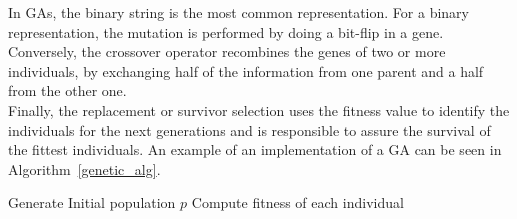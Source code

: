 In  GAs, the binary string is the most common representation. For a binary representation, the mutation is performed by doing a bit-flip in a gene.  Conversely, the crossover operator recombines the genes of two or more individuals, by exchanging half of the information from one parent and a half from the other one. \\




Finally, the replacement or survivor selection uses the fitness value to identify the individuals for the next generations and is responsible to assure the survival of the fittest individuals. An example of an implementation of a GA can be seen in Algorithm~\ref{genetic_alg}. \\

\begin{algorithm}[H]
\caption{Genetic Algorithm}
\label{genetic_alg}
\SetAlgoLined 
Generate Initial population $p$\;
Compute fitness of each individual\;\

\end{algorithm}

